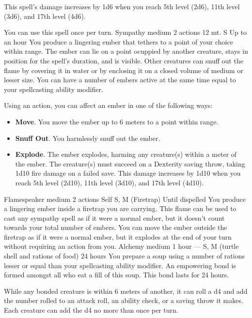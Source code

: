 This spell's damage increases by 1d6 when you reach 5th level (2d6), 11th level (3d6), and 17th level (4d6).

You can use this spell once per turn.
{Sympathy medium}
{2 actions}
{12 mt.}
{S}
{Up to an hour}
You produce a lingering ember that tethers to a point of your choice within range.
The ember can lie on a point ocuppied by another creature, stays in position for the spell's duration, and is visible.
Other creatures can snuff out the flame by covering it in water or by enclosing it on a closed volume of medium or lesser size.
You can have a number of embers active at the same time equal to your spellcasting ability modifier.

Using an action, you can affect an ember in one of the following ways:
\begin{itemize}
    \item \textbf{Move}.
    You move the ember up to 6 meters to a point within range.
    \item \textbf{Snuff Out}.
    You harmlessly snuff out the ember.
    \item \textbf{Explode}.
    The ember explodes, harming any creature(s) within a meter of the ember.
    The creature(s) must succeed on a Dexterity saving throw, taking 1d10 fire damage on a failed save.
    This damage increases by 1d10 when you reach 5th level (2d10), 11th level (3d10), and 17th level (4d10).
\end{itemize}
{Flamespeaker medium}
{2 actions}
{Self}
{S, M (Firetrap)}
{Until dispelled}
You produce a lingering ember inside a firetrap you are carrying.
This flame can be used to cast any sympathy spell as if it were a normal ember, but it doesn't count towards your total number of embers.
You can move the ember outside the firetrap as if it were a normal ember, but it explodes at the end of your turn without requiring an action from you.
    {Alchemy medium}
    {1 hour}
    {---}
    {S, M (turtle shell and rations of food)}
    {24 hours}
    You prepare a soup using a number of rations lesser or equal than your spellcasting ability modifier.
    An empowering bond is formed amongst all who eat a fill of this soup.
    This bond lasts for 24 hours.

    While any bonded creature is within 6 meters of another, it can roll a d4 and add the number rolled to an attack roll, an ability check, or a saving throw it makes.
    Each creature can add the d4 no more than once per turn.

